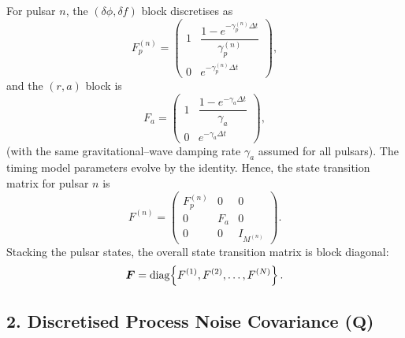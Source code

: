 \documentclass{tufte-handout} %
\begin{document}
	For pulsar $n$, the \((\delta\phi,\delta f)\) block discretises as
	\begin{equation}
		F_p^{(n)} = \begin{pmatrix}
			1 & \dfrac{1-e^{-\gamma_p^{(n)}\Delta t}}{\gamma_p^{(n)}} \\[1mm]
			0 & e^{-\gamma_p^{(n)}\Delta t}
		\end{pmatrix},
	\end{equation}
	and the \((r,a)\) block is
	\begin{equation}
		F_a = \begin{pmatrix}
			1 & \dfrac{1-e^{-\gamma_a\Delta t}}{\gamma_a} \\[1mm]
			0 & e^{-\gamma_a\Delta t}
		\end{pmatrix},
	\end{equation}
	(with the same gravitational–wave damping rate $\gamma_a$ assumed for all pulsars). The timing model parameters evolve by the identity. Hence, the state transition matrix for pulsar $n$ is
	\begin{equation}
		F^{(n)} = \begin{pmatrix}
			F_p^{(n)} & 0 & 0\\[2mm]
			0 & F_a & 0\\[2mm]
			0 & 0 & I_{M^{(n)}}
		\end{pmatrix}.
	\end{equation}
	Stacking the pulsar states, the overall state transition matrix is block diagonal:
	\begin{equation}
		\boldsymbol{F} = \mathrm{diag}\Bigl\{F^{(1)},F^{(2)},\ldots,F^{(N)}\Bigr\}\,.
	\end{equation}
	
	\subsection*{2. Discretised Process Noise Covariance (\(\boldsymbol{Q}\))}
	
\end{document}
